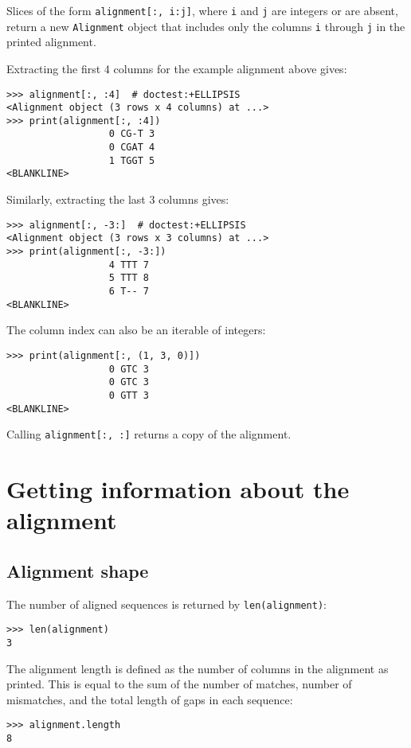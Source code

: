 Slices of the form \verb+alignment[:, i:j]+, where \verb+i+ and \verb+j+ are integers or are absent, return a new \verb+Alignment+ object that includes only the columns \verb+i+ through \verb+j+ in the printed alignment.

Extracting the first 4 columns for the example alignment above gives:
\begin{verbatim}
>>> alignment[:, :4]  # doctest:+ELLIPSIS
<Alignment object (3 rows x 4 columns) at ...>
>>> print(alignment[:, :4])
                  0 CG-T 3
                  0 CGAT 4
                  1 TGGT 5
<BLANKLINE>
\end{verbatim}

Similarly, extracting the last 3 columns gives:
\begin{verbatim}
>>> alignment[:, -3:]  # doctest:+ELLIPSIS
<Alignment object (3 rows x 3 columns) at ...>
>>> print(alignment[:, -3:])
                  4 TTT 7
                  5 TTT 8
                  6 T-- 7
<BLANKLINE>
\end{verbatim}

The column index can also be an iterable of integers:
\begin{verbatim}
>>> print(alignment[:, (1, 3, 0)])
                  0 GTC 3
                  0 GTC 3
                  0 GTT 3
<BLANKLINE>
\end{verbatim}
Calling \verb|alignment[:, :]| returns a copy of the alignment.

\section{Getting information about the alignment}

\subsection{Alignment shape}

The number of aligned sequences is returned by \verb+len(alignment)+:
\begin{verbatim}
>>> len(alignment)
3
\end{verbatim}
The alignment length is defined as the number of columns in the alignment as
printed. This is equal to the sum of the number of matches, number of
mismatches, and the total length of gaps in each sequence:
\begin{verbatim}
>>> alignment.length
8
\end{verbatim}

